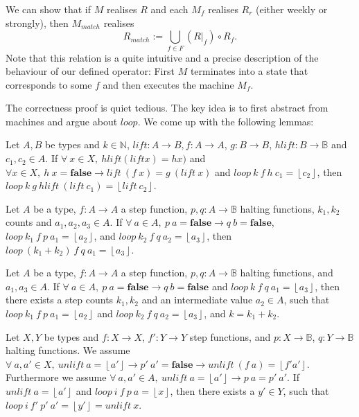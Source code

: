 \documentclass{psartcl}
\newcommand{\from}{:}
\renewcommand{\to}{\rightarrow}
\newcommand{\Bool}{\mathbb{B}}
\newcommand{\Nat}{\mathbb{N}}
\newcommand{\Some}[1]{\left\lfloor #1\right\rfloor}
\newcommand{\false}{\mathbf{false}}
\newcommand{\at}[2][]{#1|_{#2}}
\begin{document}
We can show that if $M$ realises $R$ and each $M_f$ realises $R_r$ (either weekly or strongly), then $M_{match}$ realises
$$R_{match} := \bigcup_{f \in F} (R \at f) \circ R_f.$$
Note that this relation is a quite intuitive and a precise description of the behaviour of our defined operator:  First $M$ terminates into a state
that corresponds to some $f$ and then executes the machine $M_f$.

The correctness proof is quiet tedious.  The key idea is to first abstract from machines and argue about $loop$.  We come up with the following
lemmas:

\begin{lemma}
  \label{lem:loop-lift}
  Let $A, B$ be types and $k \in \Nat$, $lift \from A \to B, f \from A \to A$, $g \from B \to B$, $hlift \from B \to \Bool$ and $c_1, c_2 \in A$.
  If $\forall~x \in X,~hlift (lift x) = h x)$ and $\forall x\in X,~ h~x = \false \rightarrow lift~(f~x) = g~(lift~x)$ and
  $loop~k~f~h~c_1 = \Some{c_2}$, then $loop~k~g~hlift~(lift~c_1) = \Some{lift~c_2}$.
\end{lemma}

\begin{lemma}
  \label{lem:loop-merge}
  Let $A$ be a type, $f \from A \to A$ a step function, $p, q \from A \to \Bool$ halting functions, $k_1, k_2$ counts and $a_1, a_2, a_3 \in A$.
  If $\forall~a \in A,~p~a = \false \rightarrow q~b = \false$, $loop~k_1~f~p~a_1 = \Some{a_2}$, and $loop~k_2~f~q~a_2 = \Some{a_3}$, then
  $loop~(k_1 + k_2)~f~q~a_1 = \Some{a_3}$.
\end{lemma}

\begin{lemma}
  \label{lem:loop-split}
  Let $A$ be a type, $f \from A \to A$ a step function, $p, q \from A \to \Bool$ halting functions, and $a_1, a_3 \in A$.
  If $\forall~a \in A,~p~a = \false \rightarrow q~b = \false$ and $loop~k~f~q~a_1 = \Some{a_3}$, then there exists a step counts $k_1, k_2$ and an
  intermediate value $a_2 \in A$, such that $loop~k_1~f~p~a_1 = \Some{a_2}$ and $loop~k_2~f~q~a_2 = \Some{a_3}$, and $k = k_1 + k_2$.
\end{lemma}

\begin{lemma}
  Let $X, Y$ be types and $f \from X \to X$, $f' \from Y \to Y$ step functions, and $p \from X \to \Bool$, $q \from Y \to \Bool$ halting functions.
  We assume $\forall~a,a' \in X,~unlift~a = \Some{a'} \rightarrow p'~a' = \false \rightarrow unlift~(f~a) = \Some{f' a'}$.
  Furthermore we assume $\forall~a,a' \in A,~unlift~a = \Some{a'} \rightarrow p~a = p'~a'$.
  If $unlift~a = \Some{a'}$ and $loop~i~f~p~a = \Some{x}$, then
  there exists a $y' \in Y$, such that $loop~i~f'~p'~a' = \Some{y'} = unlift~x$.
\end{lemma}
\end{document}
